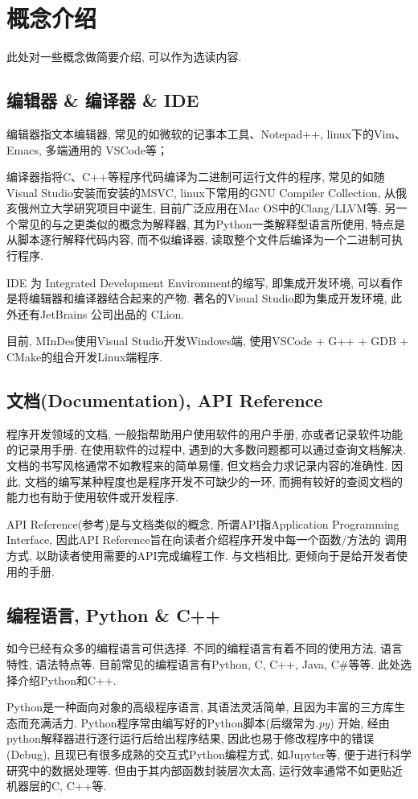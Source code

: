 \section{概念介绍}\label{Concepts}
此处对一些概念做简要介绍, 可以作为选读内容.
\subsection{编辑器 \& 编译器 \& IDE}
编辑器指文本编辑器, 常见的如微软的记事本工具、Notepad++,
linux下的Vim、Emacs, 多端通用的 VSCode等；

编译器指将C、C++等程序代码编译为二进制可运行文件的程序, 常见的如随Visual Studio安装而安装的MSVC, linux下常用的GNU Compiler Collection,
从俄亥俄州立大学研究项目中诞生, 目前广泛应用在Mac OS中的Clang/LLVM等. 另一个常见的与之更类似的概念为解释器, 其为Python一类解释型语言所使用, 
特点是从脚本逐行解释代码内容, 而不似编译器, 读取整个文件后编译为一个二进制可执行程序.

IDE 为 Integrated Development Environment的缩写, 即集成开发环境, 可以看作是将编辑器和编译器结合起来的产物.
著名的Visual Studio即为集成开发环境, 此外还有JetBrains 公司出品的 CLion.

目前, MInDes使用Visual Studio开发Windows端, 使用VSCode + G++ + GDB + CMake的组合开发Linux端程序.

\subsection{文档(Documentation), API Reference}
程序开发领域的文档, 一般指帮助用户使用软件的用户手册, 亦或者记录软件功能的记录用手册. 在使用软件的过程中, 遇到的大多数问题都可以通过查询文档解决.
文档的书写风格通常不如教程来的简单易懂, 但文档会力求记录内容的准确性. 因此, 文档的编写某种程度也是程序开发不可缺少的一环, 而拥有较好的查阅文档的
能力也有助于使用软件或开发程序.

API Reference(参考)是与文档类似的概念, 所谓API指Application Programming Interface, 因此API Reference旨在向读者介绍程序开发中每一个函数/方法的
调用方式, 以助读者使用需要的API完成编程工作. 与文档相比, 更倾向于是给开发者使用的手册.

\subsection{编程语言, Python \& C++}
如今已经有众多的编程语言可供选择. 不同的编程语言有着不同的使用方法, 语言特性, 语法特点等. 目前常见的编程语言有Python, C, C++, Java,
C\#等等. 此处选择介绍Python和C++.

Python是一种面向对象的高级程序语言, 其语法灵活简单, 且因为丰富的三方库生态而充满活力. Python程序常由编写好的Python脚本(后缀常为\emph{.py})
开始, 经由python解释器进行逐行运行后给出程序结果, 因此也易于修改程序中的错误(Debug), 且现已有很多成熟的交互式Python编程方式, 如Jupyter等,
便于进行科学研究中的数据处理等. 但由于其内部函数封装层次太高, 运行效率通常不如更贴近机器层的C, C++等.

